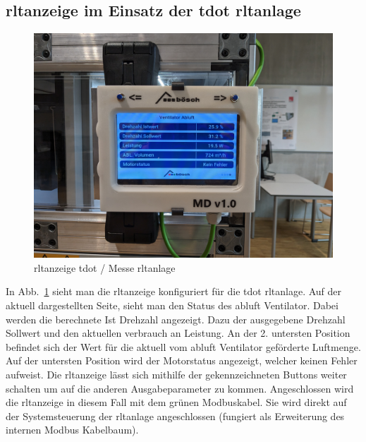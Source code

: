 \subsection{\ac{rltanzeige} im Einsatz der \gls{tdot} \ac{rltanlage}}\label{rltanzeige_tdot_kapitel}
\begin{figure}[H]
	\centering
	\includegraphics[width=0.7\linewidth]{Bilder/tdot_anzeige}
	\caption{\ac{rltanzeige} \gls{tdot} / Messe \ac{rltanlage}} 
	\label{fig:tdot_anzeige}
\end{figure}

In Abb.~\ref{fig:tdot_anzeige} sieht man die \ac{rltanzeige} konfiguriert für die \gls{tdot} \ac{rltanlage}. Auf der aktuell dargestellten Seite, sieht man den Status des \gls{abluft} Ventilator. Dabei werden die berechnete Ist Drehzahl angezeigt. Dazu der ausgegebene Drehzahl Sollwert und den aktuellen verbrauch an Leistung. An der 2. untersten Position befindet sich der Wert für die aktuell vom \gls{abluft} Ventilator geförderte Luftmenge. Auf der untersten Position wird der Motorstatus angezeigt, welcher keinen Fehler aufweist. Die \ac{rltanzeige} lässt sich mithilfe der gekennzeichneten Buttons weiter schalten um auf die anderen Ausgabeparameter zu kommen. Angeschlossen wird die \ac{rltanzeige} in diesem Fall mit dem grünen Modbuskabel. Sie wird direkt auf der Systemsteuerung der \ac{rltanlage} angeschlossen (fungiert als Erweiterung des internen Modbus Kabelbaum).

